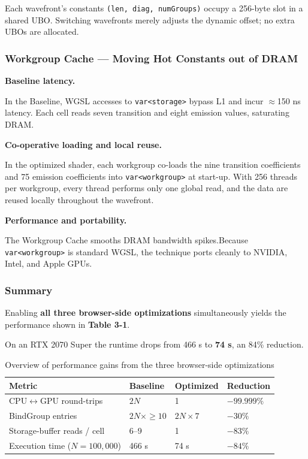 \documentclass[PhD]{PHlab-thesis}
\begin{document}
Each wavefront’s constants \texttt{(len, diag, numGroups)} occupy a 256-byte slot in a shared UBO.
Switching wavefronts merely adjusts the dynamic offset; no extra UBOs are allocated.

\subsubsection{Workgroup Cache — Moving Hot Constants out of DRAM}
\textbf{Baseline latency.}

In the Baseline, WGSL accesses to \texttt{var<storage>} bypass L1 and incur $\approx$150 ns latency.
Each cell reads seven transition and eight emission values, saturating DRAM.

\textbf{Co-operative loading and local reuse.}

In the optimized shader, each workgroup co-loads the nine transition coefficients and 75 emission coefficients into \texttt{var<workgroup>} at start-up.
With 256 threads per workgroup, every thread performs only one global read, and the data are reused locally throughout the wavefront.

\textbf{Performance and portability.}

The Workgroup Cache smooths DRAM bandwidth spikes.Because \texttt{var<workgroup>} is standard WGSL, the technique ports cleanly to NVIDIA, Intel, and Apple GPUs.

\subsubsection{Summary}
Enabling \textbf{all three browser-side optimizations} simultaneously yields the performance shown in \textbf{Table 3-1}.

On an RTX 2070 Super the runtime drops from 466 s to \textbf{74 s}, an 84\% reduction.

\begin{table}[h]
    \centering
      \setlength{\tabcolsep}{6pt}
  \renewcommand{\arraystretch}{1.4}
  \small
    \begin{tabularx}{\textwidth}{|X|X|X|X|}
        \hline
        Metric & Baseline & Optimized & Reduction \\
        \hline
        CPU$\leftrightarrow$GPU round-trips & $2N$ & 1 & $-99.999\%$ \\
        BindGroup entries & $2N \times \geq 10$ & $2N \times 7$ & $-30\%$ \\
        Storage-buffer reads / cell & 6–9 & 1 & $-83\%$ \\
        Execution time ($N = 100,000$) & 466 s & 74 s & $-84\%$ \\
        \hline
    \end{tabularx}
    \caption{Overview of performance gains from the three browser-side optimizations}
    \label{tab:opt_performance}
\end{table}
\end{document}
